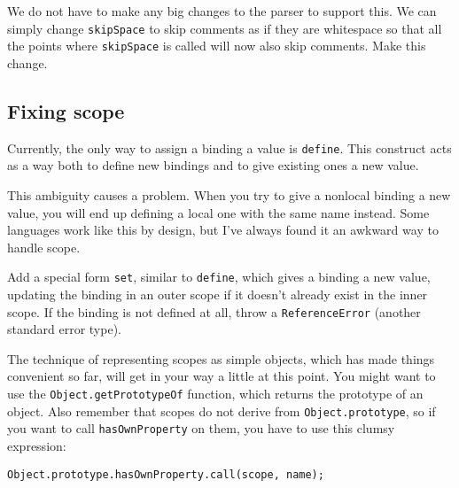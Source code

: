 We do not have to make any big changes to the parser to support this. We can simply change \lstinline`skipSpace` to skip comments as if they are whitespace so that all the points where \lstinline`skipSpace` is called will now also skip comments. Make this change.

\subsection{Fixing scope}

Currently, the only way to assign a binding a value is \lstinline`define`. This construct acts as a way both to define new bindings and to give existing ones a new value.

This ambiguity causes a problem. When you try to give a nonlocal binding a new value, you will end up defining a local one with the same name instead. Some languages work like this by design, but I've always found it an awkward way to handle scope.

Add a special form \lstinline`set`, similar to \lstinline`define`, which gives a binding a new value, updating the binding in an outer scope if it doesn't already exist in the inner scope. If the binding is not defined at all, throw a \lstinline`ReferenceError` (another standard error type).

The technique of representing scopes as simple objects, which has made things convenient so far, will get in your way a little at this point. You might want to use the \lstinline`Object.getPrototypeOf` function, which returns the prototype of an object. Also remember that scopes do not derive from \lstinline`Object.prototype`, so if you want to call \lstinline`hasOwnProperty` on them, you have to use this clumsy expression:

\begin{lstlisting}
Object.prototype.hasOwnProperty.call(scope, name);
\end{lstlisting}
\noindent
